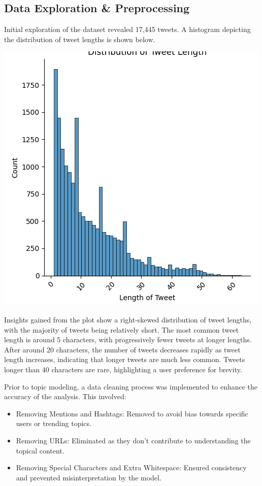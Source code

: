 \documentclass[12pt]{article}
\begin{document}
\subsection{Data Exploration & Preprocessing}
Initial exploration of the dataset revealed 17,445 tweets. A histogram depicting the distribution of tweet lengths is shown below. \\
\begin{minipage}{0.48\textwidth}
    \centering
    \includegraphics[width=\linewidth]{TweetLength.png}
        \label{fig:tweetlength1}
    \end{minipage}\hfill
Insights gained from the plot show a right-skewed distribution of tweet lengths, with the majority of tweets being relatively short. The most common tweet length is around 5 characters, with progressively fewer tweets at longer lengths. After around 20 characters, the number of tweets decreases rapidly as tweet length increases, indicating that longer tweets are much less common. Tweets longer than 40 characters are rare, highlighting a user preference for brevity.

Prior to topic modeling, a data cleaning process was implemented to enhance the accuracy of the analysis. This involved:
\begin{itemize}
    \item Removing Mentions and Hashtags: Removed to avoid bias towards specific users or trending topics.
\item Removing URLs: Eliminated as they don't contribute to understanding the topical content.
\item Removing Special Characters and Extra Whitespace: Ensured consistency and prevented misinterpretation by the model.
\end{itemize}
\end{document}
